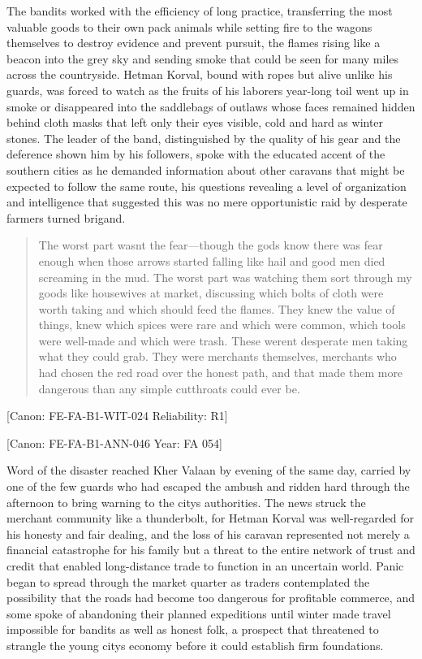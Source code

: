 The bandits worked with the efficiency of long practice, transferring
the most valuable goods to their own pack animals while setting fire to
the wagons themselves to destroy evidence and prevent pursuit, the
flames rising like a beacon into the grey sky and sending smoke that
could be seen for many miles across the countryside. Hetman Korval,
bound with ropes but alive unlike his guards, was forced to watch as the
fruits of his laborers\textquotesingle{} year-long toil went up in smoke
or disappeared into the saddlebags of outlaws whose faces remained
hidden behind cloth masks that left only their eyes visible, cold and
hard as winter stones. The leader of the band, distinguished by the
quality of his gear and the deference shown him by his followers, spoke
with the educated accent of the southern cities as he demanded
information about other caravans that might be expected to follow the
same route, his questions revealing a level of organization and
intelligence that suggested this was no mere opportunistic raid by
desperate farmers turned brigand.

\begin{quote}
The worst part wasn\textquotesingle t the fear---though the gods know
there was fear enough when those arrows started falling like hail and
good men died screaming in the mud. The worst part was watching them
sort through my goods like housewives at market, discussing which bolts
of cloth were worth taking and which should feed the flames. They knew
the value of things, knew which spices were rare and which were common,
which tools were well-made and which were trash. These
weren\textquotesingle t desperate men taking what they could grab. They
were merchants themselves, merchants who had chosen the red road over
the honest path, and that made them more dangerous than any simple
cutthroats could ever be.
\end{quote}

{[}Canon: FE-FA-B1-WIT-024 \textbar{} Reliability: R1{]}

{[}Canon: FE-FA-B1-ANN-046 \textbar{} Year: FA 054{]}

Word of the disaster reached Kher Valaan by evening of the same day,
carried by one of the few guards who had escaped the ambush and ridden
hard through the afternoon to bring warning to the
city\textquotesingle s authorities. The news struck the merchant
community like a thunderbolt, for Hetman Korval was well-regarded for
his honesty and fair dealing, and the loss of his caravan represented
not merely a financial catastrophe for his family but a threat to the
entire network of trust and credit that enabled long-distance trade to
function in an uncertain world. Panic began to spread through the market
quarter as traders contemplated the possibility that the roads had
become too dangerous for profitable commerce, and some spoke of
abandoning their planned expeditions until winter made travel impossible
for bandits as well as honest folk, a prospect that threatened to
strangle the young city\textquotesingle s economy before it could
establish firm foundations.


